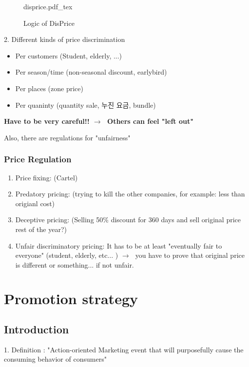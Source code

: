 \documentclass[12pt]{article}
\newcommand{\ra}{$\rightarrow \text{ }$}
\newcommand{\tb}{\textbf}
\begin{document}
\begin{itemize}
\begin{figure}[H]
	\centering
	\def\svgwidth{\columnwidth}
	{disprice.pdf_tex}
	\caption{Logic of DisPrice}
	\label{fig:disprice}
\end{figure}

2. Different kinds of price discrimination
\begin{itemize}
	\item Per customers (Student, elderly, ...)
	\item Per season/time (non-seasonal discount, earlybird)
	\item Per places (zone price)
	\item Per quaninty (quantity sale, 누진 요금, bundle)
\end{itemize}

\tb{Have to be very careful!! \ra Others can feel "left out"}

Also, there are regulations for "unfairness"



\subsubsection{Price Regulation}

\begin{enumerate}
	\item Price fixing: (Cartel)
	\item Predatory pricing: (trying to kill the other companies, for example: less than origianl cost)
	\item Deceptive pricing: (Selling 50\% discount for 360 days and sell original price rest of the year?)
	\item Unfair discriminatory pricing: It has to be at least "eventually fair to everyone" (student, elderly, etc... )
	\ra you have to prove that original price is different or something... if not unfair.
\end{enumerate}

\section{Promotion strategy}

\subsection{Introduction}

1. Definition :
"Action-oriented Marketing event that will purposefully cause the consuming behavior of consumers"


\end{itemize}
\end{document}
